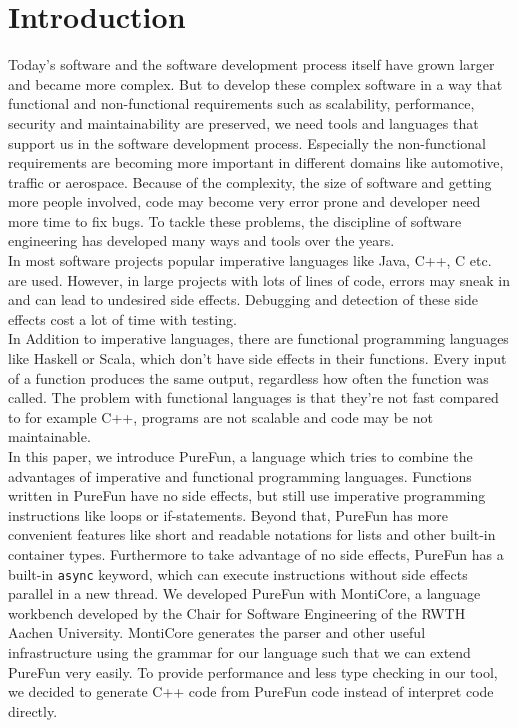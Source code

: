 \section{Introduction}


Today's software and the software development process itself have grown larger and became more complex. But to develop these complex software in a way that functional and non-functional requirements such as scalability, performance, security and maintainability are preserved, we need tools and languages that support us in the software development process.  Especially the non-functional requirements are becoming more important in different domains like automotive, traffic or aerospace. Because of the complexity, the size of software and getting more people involved, code may become very error prone and developer need more time to fix bugs. To tackle these problems, the discipline of software engineering has developed many ways and tools over the years.\\
In most software projects popular imperative languages like Java, C++, C etc. are used. However, in large projects with lots of lines of code, errors may sneak in and can lead to undesired side effects. Debugging and detection of these side effects cost a lot of time with testing.\\
In Addition to imperative languages, there are functional programming languages like Haskell or Scala, which don't have side effects in their functions. Every input of a function produces the same output, regardless how often the function was called. The problem with functional languages is that they're not fast compared to for example C++, programs are not scalable and code may be not maintainable.\\
In this paper, we introduce PureFun, a language which tries to combine the advantages of imperative and functional programming languages. Functions written in PureFun have no side effects, but still use imperative programming instructions like loops or if-statements. Beyond that, PureFun has more convenient features like short and readable notations for lists and other built-in container types. Furthermore to take advantage of no side effects, PureFun has a built-in \lstinline{async}{} keyword, which can execute instructions without side effects parallel in a new thread. We developed PureFun with MontiCore, a language workbench developed by the Chair for Software Engineering of the RWTH Aachen University. MontiCore generates the parser and other useful infrastructure using the grammar for our language such that we can extend PureFun very easily. To provide performance and less type checking in our tool, we decided to generate C++ code from PureFun code instead of interpret code directly.\\
